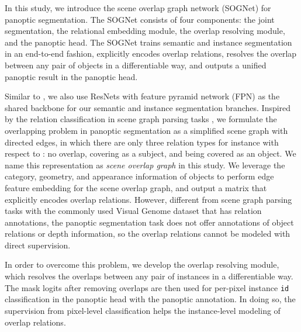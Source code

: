 \documentclass[letterpaper]{article} \usepackage{aaai20}  \usepackage{times}  \usepackage{helvet} \usepackage{courier}  \usepackage[hyphens]{url}  \usepackage{graphicx} \urlstyle{rm} \def\UrlFont{\rm}  \usepackage{graphicx}  \frenchspacing  \setlength{\pdfpagewidth}{8.5in}  \setlength{\pdfpageheight}{11in}
\begin{document}
In this study, we introduce the scene overlap graph network (SOGNet) for panoptic segmentation. The SOGNet consists of four components: the joint segmentation, the relational embedding module, the overlap resolving module, and the panoptic head. The SOGNet trains semantic and instance segmentation in an end-to-end fashion, explicitly encodes overlap relations, resolves the overlap between any pair of objects in a differentiable way, and outputs a unified panoptic result in the panoptic head. 







Similar to \cite{kirillov2019panoptic,li2018attention,liu2019end,xiong2019upsnet,mapillary,li2018learning}, we also use ResNets \cite{he2016deep} with feature pyramid network (FPN) \cite{lin2017feature} as the shared backbone for our semantic and instance segmentation branches. Inspired by the relation classification in scene graph parsing tasks \cite{zellers2018neural,woo2018linknet}, we formulate the overlapping problem in panoptic segmentation as a simplified scene graph with directed edges, in which there are only three relation types for instance  with respect to : no overlap, covering as a subject, and being covered as an object. We name this representation as \emph{scene overlap graph} in this study. We leverage the category, geometry, and appearance information of objects to perform edge feature embedding for the scene overlap graph, and output a matrix that explicitly encodes overlap relations. However, different from scene graph parsing tasks with the commonly used Visual Genome dataset \cite{krishna2017visual} that has relation annotations, the panoptic segmentation task does not offer annotations of object relations or depth information, so the overlap relations cannot be modeled with direct supervision. 





In order to overcome this problem, we develop the overlap resolving module, which resolves the overlaps between any pair of instances in a differentiable way. The mask logits after removing overlaps are then used for per-pixel instance \verb|id| classification in the panoptic head with the panoptic annotation. In doing so, the supervision from pixel-level classification helps the instance-level modeling of overlap relations.
\end{document}
